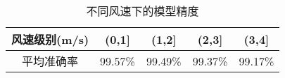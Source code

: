\begin{table}[ht]
\caption{不同风速下的模型精度}
\label{tab:check_wind}
\centering
\begin{tabular}{c|c|c|c|c}
        \toprule[1.5pt]
        风速级别(m/s) & \textbf{(0,1]} & \textbf{(1,2]} & \textbf{(2,3]} & \textbf{(3,4]}  \\
        \midrule[0.8pt]
        平均准确率  & 99.57\% & 99.49\% & 99.37\% & 99.17\% \\
        \bottomrule[1.5pt]
\end{tabular}
\end{table}